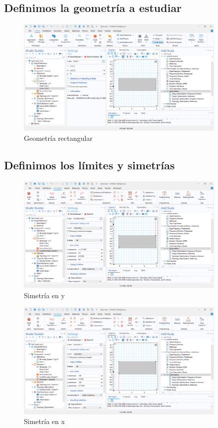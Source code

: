 \documentclass{article}
\theoremstyle{mytheoremstyle}
\theoremstyle{mytheoremstyle}
\theoremstyle{myproblemstyle}
\begin{document}
            \subsection{Definimos la geometría a estudiar}
            \begin{figure}[H]
              \centering
              \includegraphics[width=0.9\textwidth]{Geaometria.png}
              \caption{Geometría rectangular}
              \label{fig:imagen_x}
            \end{figure}

            \subsection{Definimos los límites y simetrías}
             \begin{figure}[H]
              \centering
              \includegraphics[width=0.9\textwidth]{Simetryy.png}
              \caption{Simetría en y}
              \label{fig:imagen_x}
            \end{figure}
              \begin{figure}[H]
              \centering
              \includegraphics[width=0.9\textwidth]{Simetryy2.png}
              \caption{Simetría en x}
              \label{fig:imagen_x}
            \end{figure}
\end{document}
